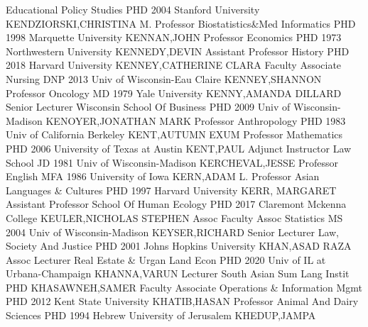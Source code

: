 \documentclass[
]{article}
\begin{document}
\textbar Educational Policy Studies \textbar PHD 2004 Stanford
University \textbar KENDZIORSKI,CHRISTINA M. \textbar{} 
\textbar Professor \textbar Biostatistics\&Med Informatics \textbar PHD
1998 Marquette University \textbar KENNAN,JOHN \textbar{} 
\textbar Professor \textbar Economics \textbar PHD 1973 Northwestern
University \textbar KENNEDY,DEVIN \textbar{} 
\textbar Assistant Professor \textbar History \textbar PHD 2018 Harvard
University \textbar KENNEY,CATHERINE CLARA \textbar{} 
\textbar Faculty Associate \textbar Nursing \textbar DNP 2013 Univ of
Wisconsin-Eau Claire \textbar KENNEY,SHANNON \textbar{} 
\textbar Professor \textbar Oncology \textbar MD 1979 Yale University
\textbar KENNY,AMANDA DILLARD \textbar{}  \textbar Senior
Lecturer \textbar Wisconsin School Of Business \textbar PHD 2009 Univ of
Wisconsin-Madison \textbar KENOYER,JONATHAN MARK \textbar{} 
\textbar Professor \textbar Anthropology \textbar PHD 1983 Univ of
California Berkeley \textbar KENT,AUTUMN EXUM \textbar{} 
\textbar Professor \textbar Mathematics \textbar PHD 2006 University of
Texas at Austin \textbar KENT,PAUL \textbar{} 
\textbar Adjunct Instructor \textbar Law School \textbar JD 1981 Univ of
Wisconsin-Madison \textbar KERCHEVAL,JESSE \textbar{} 
\textbar Professor \textbar English \textbar MFA 1986 University of Iowa
\textbar KERN,ADAM L. \textbar{}  \textbar Professor
\textbar Asian Languages \& Cultures \textbar PHD 1997 Harvard
University \textbar KERR, MARGARET \textbar{} 
\textbar Assistant Professor \textbar School Of Human Ecology
\textbar PHD 2017 Claremont Mckenna College \textbar KEULER,NICHOLAS
STEPHEN \textbar{}  \textbar Assoc Faculty Assoc
\textbar Statistics \textbar MS 2004 Univ of Wisconsin-Madison
\textbar KEYSER,RICHARD \textbar{}  \textbar Senior Lecturer
\textbar Law, Society And Justice \textbar PHD 2001 Johns Hopkins
University \textbar KHAN,ASAD RAZA \textbar{} 
\textbar Assoc Lecturer \textbar Real Estate \& Urgan Land Econ
\textbar PHD 2020 Univ of IL at Urbana-Champaign \textbar KHANNA,VARUN
\textbar{}  \textbar Lecturer \textbar South Asian Sum Lang
Instit \textbar PHD \textbar KHASAWNEH,SAMER \textbar{} 
\textbar Faculty Associate \textbar Operations \& Information Mgmt
\textbar PHD 2012 Kent State University \textbar KHATIB,HASAN \textbar{}
 \textbar Professor \textbar Animal And Dairy Sciences
\textbar PHD 1994 Hebrew University of Jerusalem \textbar KHEDUP,JAMPA
\end{document}
